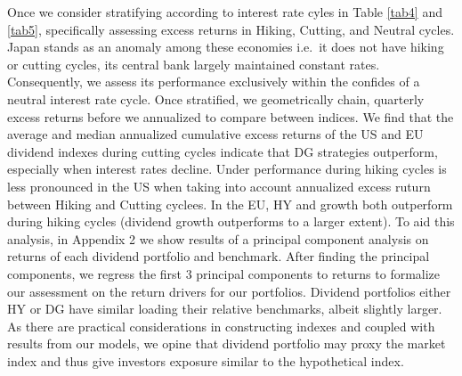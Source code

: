 \documentclass[11pt,preprint, authoryear]{elsarticle}
\numberwithin{equation}{section}
\numberwithin{figure}{section}
\numberwithin{table}{section}
\begin{document}
Once we consider stratifying according to interest rate cyles in Table
\ref{tab4} and \ref{tab5}, specifically assessing excess returns in
Hiking, Cutting, and Neutral cycles. Japan stands as an anomaly among
these economies i.e.~it does not have hiking or cutting cycles, its
central bank largely maintained constant rates. Consequently, we assess
its performance exclusively within the confides of a neutral interest
rate cycle. Once stratified, we geometrically chain, quarterly excess
returns before we annualized to compare between indices. We find that
the average and median annualized cumulative excess returns of the US
and EU dividend indexes during cutting cycles indicate that DG
strategies outperform, especially when interest rates decline. Under
performance during hiking cycles is less pronounced in the US when
taking into account annualized excess ruturn between Hiking and Cutting
cyclees. In the EU, HY and growth both outperform during hiking cycles
(dividend growth outperforms to a larger extent). To aid this analysis,
in Appendix 2 we show results of a principal component analysis on
returns of each dividend portfolio and benchmark. After finding the
principal components, we regress the first 3 principal components to
returns to formalize our assessment on the return drivers for our
portfolios. Dividend portfolios either HY or DG have similar loading
their relative benchmarks, albeit slightly larger. As there are
practical considerations in constructing indexes and coupled with
results from our models, we opine that dividend portfolio may proxy the
market index and thus give investors exposure similar to the
hypothetical index. \begingroup\fontsize{12pt}{13pt}\selectfont
\end{document}
